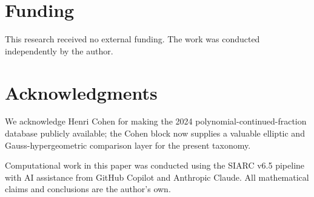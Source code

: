 \documentclass[11pt]{article}
\begin{document}
\section*{Funding}
This research received no external funding. The work was conducted 
independently by the author.

\section*{Acknowledgments}
We acknowledge Henri Cohen for making the 2024 polynomial-continued-fraction database publicly available; the Cohen block now supplies a valuable elliptic and Gauss-hypergeometric comparison layer for the present taxonomy.

Computational work in this paper was conducted using the SIARC
v6.5 pipeline with AI assistance from GitHub Copilot and
Anthropic Claude. All mathematical claims and conclusions are
the author's own.



\end{document}
